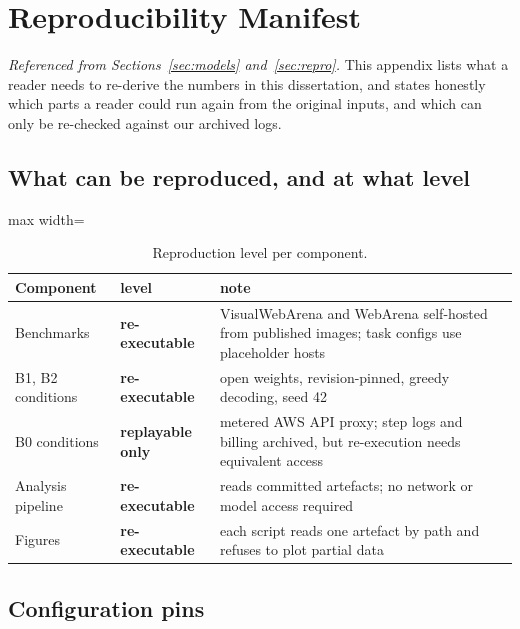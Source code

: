 \chapter{Reproducibility Manifest}
\label{app:repro}

\emph{Referenced from Sections~\ref{sec:models} and~\ref{sec:repro}.} This
appendix lists what a reader needs to re-derive the numbers in this
dissertation, and states honestly which parts a reader could run again from
the original inputs, and which can only be re-checked against our archived
logs.

\section{What can be reproduced, and at what level}

\begin{table}[H]
\centering\small
\caption{Reproduction level per component.}
\label{tab:app-repro-level}
\begin{adjustbox}{max width=\textwidth}
\begin{tabular}{@{}llp{6.6cm}@{}}
\toprule
Component & level & note \\
\midrule
Benchmarks & \textbf{re-executable} & VisualWebArena and WebArena self-hosted
  from published images; task configs use placeholder hosts \\
B1, B2 conditions & \textbf{re-executable} & open weights, revision-pinned,
  greedy decoding, seed 42 \\
B0 conditions & \textbf{replayable only} & metered AWS API proxy; step logs and
  billing archived, but re-execution needs equivalent access \\
Analysis pipeline & \textbf{re-executable} & reads committed artefacts; no
  network or model access required \\
Figures & \textbf{re-executable} & each script reads one artefact by path and
  refuses to plot partial data \\
\bottomrule
\end{tabular}
\end{adjustbox}
\end{table}

\FloatBarrier
\section{Configuration pins}

